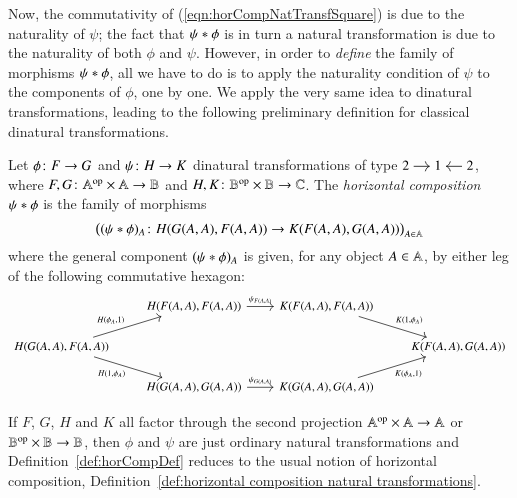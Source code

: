 Now, the commutativity of (\ref{eqn:horCompNatTransfSquare}) is due to the
naturality of $\psi$; the fact that $\hc \phi \psi$ is in turn a natural
transformation is due to the naturality of both $\phi$ and $\psi$. However, in
order to \emph{define} the family of morphisms $\hc \phi \psi$, all we have to
do is to apply the naturality condition of $\psi$ to the components of $\phi$,
one by one. We apply the very same idea to  dinatural
transformations, leading to the following preliminary definition
for classical dinatural transformations.  

\begin{definition}\label{def:horCompDef}
	Let $\fst\colon\fstDom \to \fstCoDom$ and $\psi \colon H \to K$ dinatural transformations of type
	$
	\begin{tikzcd}[cramped,sep=small]
	2 \ar[r] & 1 & 2 \ar[l]
	\end{tikzcd}
	$,
	where $F, G \colon \mathbb A^{\text{op}} \times \mathbb A \to \mathbb B$ and $H, K \colon \mathbb B^{\text{op}} \times \mathbb B \to \mathbb C$. The \emph{horizontal composition} $\hc \fst \snd$ is the family of morphisms 
	\[
	\bigl((\hc \fst \snd)_A\colon 	\sndDom(\fstCoDom(A,A), \fstDom(A,A)) \to  \sndCoDom(\fstDom(A,A),\fstCoDom(A,A))\bigr)_{A \in \A}
	\]
	where the general component $(\hc \fst \snd)_A$ is given, for any object $A \in \mathbb A$, by either leg of the following commutative hexagon:
	\[
	\begin{tikzcd}[column sep=.8cm,font=\normalsize]
	& \sndDom(\fstDom(A,A),\fstDom(A,A)) \ar[r,"{\snd_{\fstDom(A,A)}}"]  & \sndCoDom(\fstDom(A,A),\fstDom(A,A)) \ar[dr,"{\sndCoDom(1,\fst_A)}"] \\
	\sndDom(\fstCoDom(A,A),\fstDom(A,A)) \ar[ur,"{\sndDom(\fst_A,1)}"]  \ar[dr,"{\sndDom(1,\fst_A)}"']  & & & \sndCoDom(\fstDom(A,A),\fstCoDom(A,A)) \\
	& \sndDom(\fstCoDom(A,A),\fstCoDom(A,A)) \ar[r,"{\snd_{\fstCoDom(A,A)}}"] & \sndCoDom(\fstCoDom(A,A),\fstCoDom(A,A)) \ar[ur,"{\sndCoDom(\fst_A,1)}"']
	\end{tikzcd}
	\]
\end{definition}

\begin{remark}\label{rem:our definition of hc generalises natural case}
	If $F$, $G$, $H$ and $K$ all factor through the second projection $\mathbb A^{\text{op}} \times \mathbb A \to \mathbb A$ or $\mathbb B^{\text{op}} \times \mathbb B \to \mathbb B$, then $\phi$ and $\psi$ are just ordinary natural transformations and Definition~\ref{def:horCompDef} reduces to the usual notion of horizontal composition, Definition~\ref{def:horizontal composition natural transformations}.
\end{remark}

